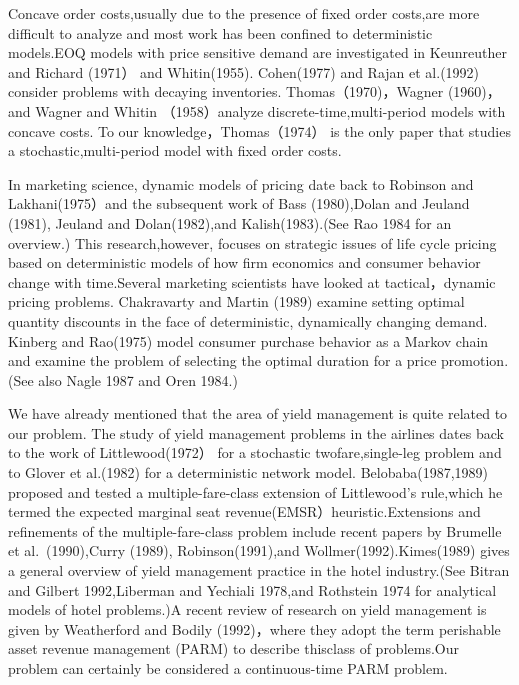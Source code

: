 Concave order costs,usually due to the presence of fixed order costs,are
more difficult to analyze and most work has been confined to
deterministic models.EOQ models with price sensitive demand are
investigated in Keunreuther and Richard (1971） and Whitin(1955).
Cohen(1977) and Rajan et al.(1992) consider problems with decaying
inventories. Thomas（1970)，Wagner (1960)，and Wagner and Whitin
（1958）analyze discrete-time,multi-period models with concave costs. To
our knowledge，Thomas（1974） is the only paper that studies a
stochastic,multi-period model with fixed order costs.

In marketing science, dynamic models of pricing date back to Robinson
and Lakhani(1975）and the subsequent work of Bass (1980),Dolan and
Jeuland (1981), Jeuland and Dolan(1982),and Kalish(1983).(See Rao 1984
for an overview.) This research,however, focuses on strategic issues of
life cycle pricing based on deterministic models of how firm economics
and consumer behavior change with time.Several marketing scientists have
looked at tactical，dynamic pricing problems. Chakravarty and Martin
(1989) examine setting optimal quantity discounts in the face of
deterministic, dynamically changing demand. Kinberg and Rao(1975) model
consumer purchase behavior as a Markov chain and examine the problem of
selecting the optimal duration for a price promotion.(See also Nagle
1987 and Oren 1984.)

We have already mentioned that the area of yield management is quite
related to our problem. The study of yield management problems in the
airlines dates back to the work of Littlewood(1972） for a stochastic
twofare,single-leg problem and to Glover et al.(1982) for a
deterministic network model. Belobaba(1987,1989) proposed and tested a
multiple-fare-class extension of Littlewood's rule,which he termed the
expected marginal seat revenue(EMSR）heuristic.Extensions and
refinements of the multiple-fare-class problem include recent papers by
Brumelle et al.~(1990),Curry (1989), Robinson(1991),and
Wollmer(1992).Kimes(1989) gives a general overview of yield management
practice in the hotel industry.(See Bitran and Gilbert 1992,Liberman and
Yechiali 1978,and Rothstein 1974 for analytical models of hotel
problems.)A recent review of research on yield management is given by
Weatherford and Bodily (1992)，where they adopt the term perishable
asset revenue management (PARM) to describe thisclass of problems.Our
problem can certainly be considered a continuous-time PARM problem.

